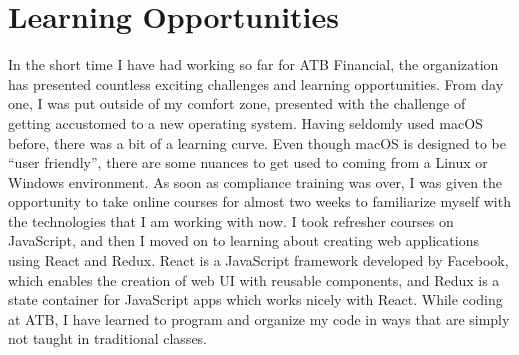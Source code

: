 \documentclass[letterpaper,12pt]{article}
\begin{document}


\section{Learning Opportunities}

In the short time I have had working so far for ATB Financial, the organization has presented
countless exciting challenges and learning opportunities.
From day one, I was put outside of my comfort zone, presented with the challenge of
getting accustomed to a new operating system. Having seldomly used macOS before,
there was a bit of a learning curve. Even though macOS is designed to be ``user friendly'',
there are some nuances to get used to coming from a Linux or Windows environment.
As soon as compliance training was over, I was given the opportunity to take online
courses for almost two weeks to familiarize myself with the technologies that I am
working with now. I took refresher courses on JavaScript, and then I moved on to learning
about creating web applications using React and Redux. React is a JavaScript framework developed by Facebook,
which enables the creation of web UI with reusable components\cite{react}, and Redux is a state container
for JavaScript apps\cite{redux} which works nicely with React. While coding at ATB,
I have learned to program and organize my code in ways that are simply not taught in traditional
classes.
\end{document}
